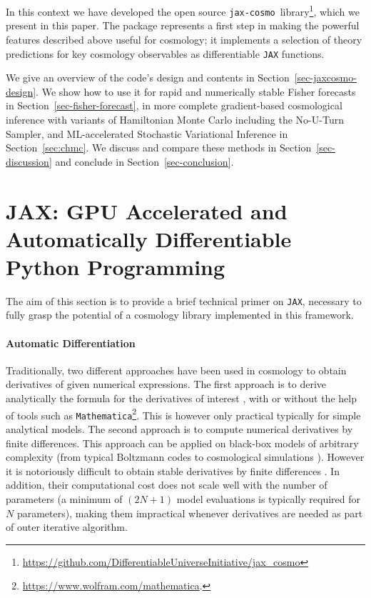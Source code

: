 \documentclass[twocolumn,twocolappendix,nofootinbib,iop]{openjournal}
\newcommand{\FrL}[1]{{\color{cyan}FL: #1}}
\newcommand{\jaxcosmo}{\texttt{jax-cosmo}}
\begin{document}
In this context we have developed the open source \jaxcosmo\ library\footnote{\url{https://github.com/DifferentiableUniverseInitiative/jax_cosmo}}, which we present in this paper. The package represents a first step in making the powerful features described above useful for cosmology; it implements a selection of theory predictions for key cosmology observables as differentiable \texttt{JAX} functions.


We give an overview of the code's design and contents in Section~\ref{sec-jaxcosmo-design}. We show how to use it for rapid and numerically stable Fisher forecasts in Section~\ref{sec-fisher-forecast}, in more complete gradient-based cosmological inference with variants of Hamiltonian Monte Carlo including the No-U-Turn Sampler, and ML-accelerated Stochastic Variational Inference in Section~\ref{sec:chmc}. We discuss and compare these methods in Section~\ref{sec-discussion} and conclude in Section~\ref{sec-conclusion}.



\section{JAX: GPU Accelerated and Automatically Differentiable Python Programming}
\label{sec-primer}

The aim of this section is to provide a brief technical primer on \texttt{JAX}, necessary to fully grasp the potential of a cosmology library implemented in this framework.


\paragraph{\textbf{Automatic Differentiation}} Traditionally, two different approaches have been used in cosmology to obtain derivatives of given numerical expressions. The first approach is to derive analytically the formula for the derivatives of interest \citep[e.g.][]{2013MNRAS.432..894J}, with or without the help of tools such as \texttt{Mathematica}\footnote{\url{https://www.wolfram.com/mathematica}.}. This is however only practical typically for simple analytical models.
The second approach is to compute numerical derivatives by finite differences. This approach can be applied on black-box models of arbitrary complexity (from typical Boltzmann codes to cosmological simulations \citep{2020ApJS..250....2V}). However it is notoriously difficult to obtain stable derivatives by finite differences \citep[e.g.][]{2021arXiv210100298B, 2021A&A...649A..52Y}. In addition, their computational cost does not scale well with the number of parameters (a minimum of $(2N+1)$ model evaluations is typically required for $N$ parameters), making them impractical whenever derivatives are needed as part of outer iterative algorithm.
\end{document}
